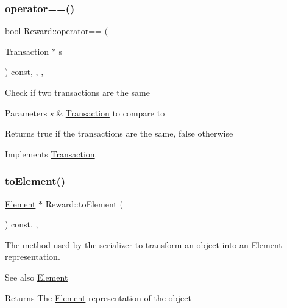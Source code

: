 \subsubsection{\texorpdfstring{operator==()}{operator==()}}
{\footnotesize\ttfamily bool Reward\+::operator== (\begin{DoxyParamCaption}\item[{\mbox{\hyperlink{classTransaction}{Transaction}} $\ast$}]{s }\end{DoxyParamCaption}) const\hspace{0.3cm}{\ttfamily [inline]}, {\ttfamily [final]}, {\ttfamily [virtual]}, {\ttfamily [inherited]}}

Check if two transactions are the same


\begin{DoxyParams}{Parameters}
{\em s} & \mbox{\hyperlink{classTransaction}{Transaction}} to compare to \\
\hline
\end{DoxyParams}
\begin{DoxyReturn}{Returns}
true if the transactions are the same, false otherwise 
\end{DoxyReturn}


Implements \mbox{\hyperlink{classTransaction_a9a17c97fdcda6791484ad6d07b34470e}{Transaction}}.

\mbox{\label{classReward_a0ecd536148463880f9980fe415b6eb1d}} 
\subsubsection{\texorpdfstring{to\+Element()}{toElement()}}
{\footnotesize\ttfamily \mbox{\hyperlink{classElement}{Element}} $\ast$ Reward\+::to\+Element (\begin{DoxyParamCaption}{ }\end{DoxyParamCaption}) const\hspace{0.3cm}{\ttfamily [final]}, {\ttfamily [virtual]}, {\ttfamily [inherited]}}

The method used by the serializer to transform an object into an \mbox{\hyperlink{classElement}{Element}} representation. \begin{DoxySeeAlso}{See also}
\mbox{\hyperlink{classElement}{Element}}
\end{DoxySeeAlso}
\begin{DoxyReturn}{Returns}
The \mbox{\hyperlink{classElement}{Element}} representation of the object 
\end{DoxyReturn}


